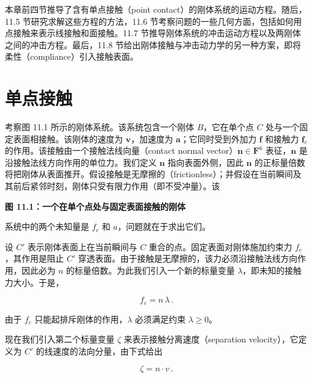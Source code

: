 \documentclass[10pt,a4paper]{book}
\theoremstyle{thmstyle} %
\theoremstyle{defstyle} %
\theoremstyle{prostyle} %
\begin{document}
本章前四节推导了含有单点接触（point contact）的刚体系统的运动方程。随后，11.5 节研究求解这些方程的方法，11.6 节考察问题的一些几何方面，包括如何用点接触来表示线接触和面接触。11.7 节推导刚体系统的冲击运动方程以及两刚体之间的冲击方程。最后，11.8 节给出刚体接触与冲击动力学的另一种方案，即将柔性（compliance）引入接触表面。



\section{单点接触}





考察图 11.1 所示的刚体系统。该系统包含一个刚体 $B$，它在单个点 $C$ 处与一个固定表面相接触。该刚体的速度为 $\boldsymbol{v}$，加速度为 $\boldsymbol{a}$；它同时受到外加力 $\boldsymbol{f}$ 和接触力 $\boldsymbol{f}_{c}$ 的作用。该接触由一个接触法线向量（contact normal vector）$\boldsymbol{n} \in \mathbf{F}^{6}$ 表征，$\boldsymbol{n}$ 是沿接触法线方向作用的单位力。我们定义 $\boldsymbol{n}$ 指向表面外侧，因此 $\boldsymbol{n}$ 的正标量倍数将把刚体从表面推开。假设接触是无摩擦的（frictionless）；并假设在当前瞬间及其前后紧邻时刻，刚体只受有限力作用（即不受冲量）。该



\noindent\textbf{图 11.1：一个在单个点处与固定表面接触的刚体}





系统中的两个未知量是 $f_{c}$ 和 $a$，问题就在于求出它们。



设 $C'$ 表示刚体表面上在当前瞬间与 $C$ 重合的点。固定表面对刚体施加约束力 $f_c$，其作用是阻止 $C'$ 穿透表面。由于接触是无摩擦的，该力必须沿接触法线方向作用，因此必为 $n$ 的标量倍数。为此我们引入一个新的标量变量 $\lambda$，即未知的接触力大小。于是，



$$
f _ { c } = n \, \lambda \, .
$$



由于 $f_{c}$ 只能起排斥刚体的作用，$\lambda$ 必须满足约束 $\lambda \geq 0$。



现在我们引入第二个标量变量 $\zeta$ 来表示接触分离速度（separation velocity），它定义为 $C'$ 的线速度的法向分量，由下式给出



$$
\zeta = n \cdot v \, .
$$
\end{document}
